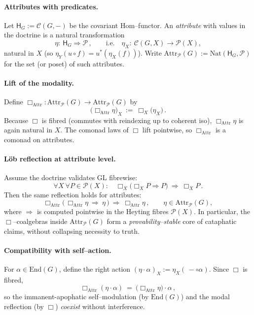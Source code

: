 \documentclass[11pt]{article}
\theoremstyle{upright}
\begin{document}
\paragraph{Attributes with predicates.}
Let $\mathsf H_G:=\mathcal C(G,-)$ be the covariant Hom–functor. An \emph{attribute} with values in the doctrine is a natural transformation
\[
\eta:\ \mathsf H_G\Longrightarrow \mathcal P\,,
\qquad\text{i.e.}\quad
\eta_X:\ \mathcal C(G,X)\longrightarrow \mathcal P(X),
\]
natural in $X$ (so $\eta_Y(u\circ f)=u^\ast(\eta_X(f))$). Write $\mathrm{Attr}_\mathcal P(G):=\mathrm{Nat}(\mathsf H_G,\mathcal P)$ for the set (or poset) of such attributes.

\paragraph{Lift of the modality.}
Define $\Box_{\!\mathrm{Attr}}:\mathrm{Attr}_\mathcal P(G)\!\to\!\mathrm{Attr}_\mathcal P(G)$ by
\[
\big(\Box_{\!\mathrm{Attr}}\eta\big)_X\ :=\ \Box_X\!\big(\eta_X\big)\,.
\]
Because $\Box$ is fibred (commutes with reindexing up to coherent iso), $\Box_{\!\mathrm{Attr}}\eta$ is again natural in $X$. The comonad laws of $\Box$ lift pointwise, so $\Box_{\!\mathrm{Attr}}$ is a comonad on attributes.

\paragraph{Löb reflection at attribute level.}
Assume the doctrine validates GL fibrewise:
\[
\forall X\ \forall P\in\mathcal P(X):\quad \Box_X\!\big(\Box_X P \Rightarrow P\big)\ \Rightarrow\ \Box_X P\,.
\]
Then the same reflection holds for attributes:
\[
\Box_{\!\mathrm{Attr}}\!\Big(\,\Box_{\!\mathrm{Attr}}\eta\ \Rightarrow\ \eta\,\Big)\ \Rightarrow\ \Box_{\!\mathrm{Attr}}\eta\,,
\qquad \eta\in \mathrm{Attr}_\mathcal P(G),
\]
where $\Rightarrow$ is computed pointwise in the Heyting fibres $\mathcal P(X)$. In particular, the $\Box$–coalgebras inside $\mathrm{Attr}_\mathcal P(G)$ form a \emph{provability–stable} core of cataphatic claims, without collapsing necessity to truth.

\paragraph{Compatibility with self–action.}
For $\alpha\in\mathrm{End}(G)$, define the right action $(\eta\cdot\alpha)_X:=\eta_X(\,{-}\circ \alpha)$. Since $\Box$ is fibred,
\[
\Box_{\!\mathrm{Attr}}(\eta\cdot\alpha)\ =\ \big(\Box_{\!\mathrm{Attr}}\eta\big)\cdot \alpha\,,
\]
so the immanent-apophatic self–modulation (by $\mathrm{End}(G)$) and the modal reflection (by $\Box$) \emph{coexist} without interference.
\end{document}
